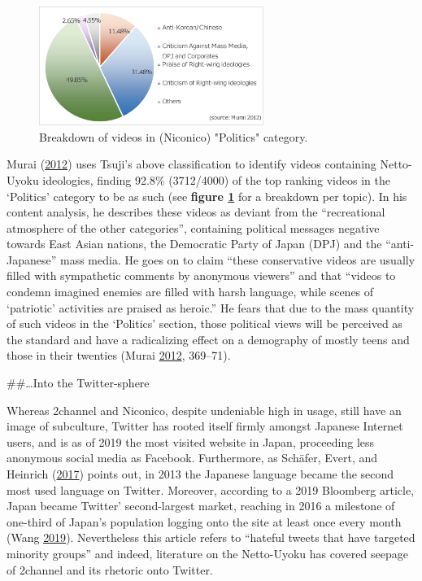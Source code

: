 \documentclass[10pt,british,A4paper,,openany]{memoir}
\begin{document}
\begin{figure}[!htb]
 \centering
  \caption{\label{fig:murai-ratio} Breakdown of videos in (Niconico) "Politics" category.}
 \includegraphics[width=0.65\textwidth,trim=4 4 4 4,clip]{images/murai-ratio2.eps}
\end{figure}

Murai (\protect\hyperlink{ref-murai_net_2012}{2012}) uses Tsuji's above
classification to identify videos containing Netto-Uyoku ideologies,
finding 92.8\% (3712/4000) of the top ranking videos in the `Politics'
category to be as such (see \textbf{figure \ref{fig:murai-ratio}} for a
breakdown per topic). In his content analysis, he describes these videos
as deviant from the ``recreational atmosphere of the other categories'',
containing political messages negative towards East Asian nations, the
Democratic Party of Japan (DPJ) and the ``anti-Japanese'' mass media. He
goes on to claim ``these conservative videos are usually filled with
sympathetic comments by anonymous viewers'' and that ``videos to condemn
imagined enemies are filled with harsh language, while scenes of
`patriotic' activities are praised as heroic.'' He fears that due to the
mass quantity of such videos in the `Politics' section, those political
views will be perceived as the standard and have a radicalizing effect
on a demography of mostly teens and those in their twenties (Murai
\protect\hyperlink{ref-murai_net_2012}{2012}, 369--71).

\#\#\ldots{}Into the Twitter-sphere

Whereas 2channel and Niconico, despite undeniable high in usage, still
have an image of subculture, Twitter has rooted itself firmly amongst
Japanese Internet users, and is as of 2019 the  most visited
website in Japan, proceeding less anonymous social media as Facebook.
Furthermore, as Schäfer, Evert, and Heinrich
(\protect\hyperlink{ref-schafer_japans_2017}{2017}) points out, in 2013
the Japanese language became the second most used language on Twitter.
Moreover, according to a 2019 Bloomberg article, Japan became Twitter'
second-largest market, reaching in 2016 a milestone of one-third of
Japan's population logging onto the site at least once every month (Wang
\protect\hyperlink{ref-wang_how_2019}{2019}). Nevertheless this article
refers to ``hateful tweets that have targeted minority groups'' and
indeed, literature on the Netto-Uyoku has covered seepage of 2channel
and its rhetoric onto Twitter.
\end{document}
